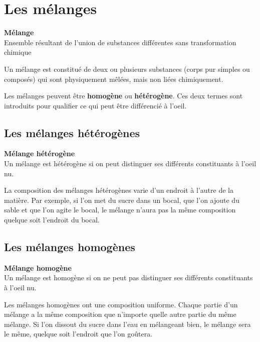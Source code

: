 \documentclass[
  11pt,
  a4paper,
  openany]{book}
\begin{document}
\section{Les mélanges}\label{les-muxe9langes}

\begin{tcolorbox}
\textbf{Mélange}\\
Ensemble résultant de l'union de substances différentes sans transformation chimique

\end{tcolorbox}

Un mélange est constitué de deux ou plusieurs substances (corps pur simples ou composés) qui sont physiquement mêlées, mais non liées chimiquement.

Les mélanges peuvent être \textbf{homogène} ou \textbf{hétérogène}. Ces deux termes sont introduits pour qualifier ce qui peut être différencié à l'oeil.

\subsection{Les mélanges hétérogènes}\label{les-muxe9langes-huxe9tuxe9roguxe8nes}

\begin{tcolorbox}
\textbf{Mélange hétérogène}\\
Un mélange est hétérogène si on peut distinguer ses différents constituants à l'oeil nu.

\end{tcolorbox}

La composition des mélanges hétérogènes varie d'un endroit à l'autre de la matière. Par exemple, si l'on met du sucre dans un bocal, que l'on ajoute du sable et que l'on agite le bocal, le mélange n'aura pas la même composition quelque soit l'endroit du bocal.

\subsection{Les mélanges homogènes}\label{les-muxe9langes-homoguxe8nes}

\begin{tcolorbox}
\textbf{Mélange homogène}\\
Un mélange est homogène si on ne peut pas distinguer ses différents constituants à l'oeil nu.

\end{tcolorbox}

Les mélanges homogènes ont une composition uniforme. Chaque partie d'un mélange a la même composition que n'importe quelle autre partie du même mélange. Si l'on dissout du sucre dans l'eau en mélangeant bien, le mélange sera le même, quelque soit l'endroit que l'on goûtera.
\end{document}
